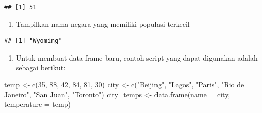 \documentclass[
]{article}
\newenvironment{Shaded}{\begin{snugshade}}{\end{snugshade}}
\newcommand{\AttributeTok}[1]{\textcolor[rgb]{0.77,0.63,0.00}{#1}}
\newcommand{\DecValTok}[1]{\textcolor[rgb]{0.00,0.00,0.81}{#1}}
\newcommand{\FunctionTok}[1]{\textcolor[rgb]{0.00,0.00,0.00}{#1}}
\newcommand{\NormalTok}[1]{#1}
\newcommand{\OtherTok}[1]{\textcolor[rgb]{0.56,0.35,0.01}{#1}}
\newcommand{\SpecialCharTok}[1]{\textcolor[rgb]{0.00,0.00,0.00}{#1}}
\newcommand{\StringTok}[1]{\textcolor[rgb]{0.31,0.60,0.02}{#1}}
\providecommand{\tightlist}{%
  \setlength{\itemsep}{0pt}\setlength{\parskip}{0pt}}
\begin{document}
\begin{Shaded}
\end{Shaded}

\begin{verbatim}
## [1] 51
\end{verbatim}

\begin{enumerate}
\def\labelenumi{\arabic{enumi}.}
\setcounter{enumi}{3}
\tightlist
\item
  Tampilkan nama negara yang memiliki populasi terkecil
\end{enumerate}

\begin{Shaded}
\end{Shaded}

\begin{verbatim}
## [1] "Wyoming"
\end{verbatim}

\begin{enumerate}
\def\labelenumi{\arabic{enumi}.}
\setcounter{enumi}{4}
\tightlist
\item
  Untuk membuat data frame baru, contoh script yang dapat digunakan
  adalah sebagai berikut:
\end{enumerate}

\begin{Shaded}
\begin{Highlighting}[]
\NormalTok{temp }\OtherTok{\textless{}{-}} \FunctionTok{c}\NormalTok{(}\DecValTok{35}\NormalTok{, }\DecValTok{88}\NormalTok{, }\DecValTok{42}\NormalTok{, }\DecValTok{84}\NormalTok{, }\DecValTok{81}\NormalTok{, }\DecValTok{30}\NormalTok{)}
\NormalTok{city }\OtherTok{\textless{}{-}} \FunctionTok{c}\NormalTok{(}\StringTok{"Beijing"}\NormalTok{, }\StringTok{"Lagos"}\NormalTok{, }\StringTok{"Paris"}\NormalTok{, }\StringTok{"Rio de Janeiro"}\NormalTok{, }\StringTok{"San Juan"}\NormalTok{, }\StringTok{"Toronto"}\NormalTok{)}
\NormalTok{city\_temps }\OtherTok{\textless{}{-}} \FunctionTok{data.frame}\NormalTok{(}\AttributeTok{name =}\NormalTok{ city, }\AttributeTok{temperature =}\NormalTok{ temp)}
\end{Highlighting}
\end{Shaded}
\end{document}
